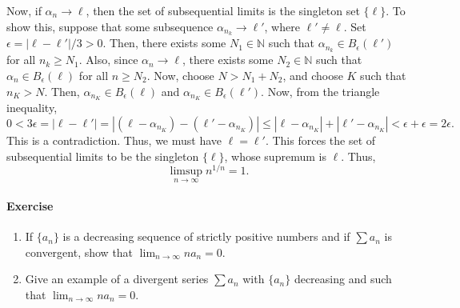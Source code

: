 \documentclass[10pt]{article}
\newcounter{prob}
\def\problem{\stepcounter{prob}\paragraph{Exercise \arabic{prob}}}
\begin{document}
        Now, if $\alpha_n \to \ell$, then the set of subsequential limits is the singleton set $\{\ell\}$.
        To show this, suppose that some subsequence $\alpha_{n_k} \to \ell'$, where $\ell' \neq \ell$.
        Set $\epsilon = |\ell - \ell'| /3 > 0$. Then, there exists some $N_1 \in \mathbb{N}$ such that
        $\alpha_{n_k} \in B_\epsilon(\ell')$ for all $n_k \geq N_1$. Also, since $\alpha_n \to \ell$, there exists some $N_2 \in \mathbb{N}$
        such that $\alpha_n \in B_\epsilon(\ell)$ for all $n \geq N_2$. Now, choose $N > N_1 + N_2$, and choose $K$ such that $n_K > N$.
        Then, $\alpha_{n_K} \in B_\epsilon(\ell)$ and $\alpha_{n_K} \in B_\epsilon(\ell')$. Now, from the triangle inequality,
        \[
                0 < 3\epsilon = |\ell - \ell'| = |(\ell - \alpha_{n_K}) - (\ell' - \alpha_{n_K})| \leq |\ell - \alpha_{n_K}| + |\ell' - \alpha_{n_K}|
                        < \epsilon + \epsilon = 2\epsilon.
        \]
        This is a contradiction. Thus, we must have $\ell = \ell'$. This forces the set of subsequential limits to be the singleton $\{\ell\}$,
        whose supremum is $\ell$. Thus,
        \[
                \limsup_{n \to \infty} n^{1 /n} = 1.
        \]

        \problem
        \begin{enumerate}
                \item If $\{a_n\}$ is a decreasing sequence of strictly positive numbers and if $\sum a_n$ is convergent, show that
                $\lim_{n \to \infty} na_n = 0$.
                \item Give an example of a divergent series $\sum a_n$ with $\{a_n\}$ decreasing and such that $\lim_{n \to \infty} na_n = 0$.
        \end{enumerate}
\end{document}
